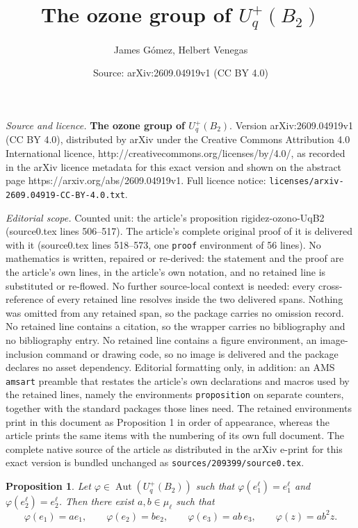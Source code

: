 \documentclass[10pt,a4paper]{amsart}
\title{\textbf{The ozone group of $U_q^+(B_2)$}}
\author{James G\'omez, Helbert Venegas}
\date{Source: arXiv:2609.04919v1 (CC BY 4.0)}
\newtheorem{proposition}{Proposition}
\begin{document}
\maketitle

\noindent\emph{Source and licence.} \textbf{The ozone group of $U_q^+(B_2)$}. Version arXiv:2609.04919v1 (CC BY 4.0), distributed by arXiv under the Creative Commons Attribution 4.0 International licence, http://creativecommons.org/licenses/by/4.0/, as recorded in the arXiv licence metadata for this exact version and shown on the abstract page https://arxiv.org/abs/2609.04919v1. Full licence notice: \texttt{licenses/arxiv-2609.04919-CC-BY-4.0.txt}.\par\smallskip

\noindent\textit{Editorial scope.} Counted unit: the article's proposition rigidez-ozono-UqB2 (source0.tex lines 506--517). The article's complete original proof of it is delivered with it (source0.tex lines 518--573, one \texttt{proof} environment of 56 lines). No mathematics is written, repaired or re-derived: the statement and the proof are the article's own lines, in the article's own notation, and no retained line is substituted or re-flowed.  No further source-local context is needed: every cross-reference of every retained line resolves inside the two delivered spans.  Nothing was omitted from any retained span, so the package carries no omission record.  No retained line contains a citation, so the wrapper carries no bibliography and no bibliography entry.  No retained line contains a figure environment, an image-inclusion command or drawing code, so no image is delivered and the package declares no asset dependency.  Editorial formatting only, in addition: an AMS \texttt{amsart} preamble that restates the article's own declarations and macros used by the retained lines, namely the environments \texttt{proposition} on separate counters, together with the standard packages those lines need.  The retained environments print in this document as Proposition 1 in order of appearance, whereas the article prints the same items with the numbering of its own full document.  The complete native source of the article as distributed in the arXiv e-print for this exact version is bundled unchanged as \texttt{sources/209399/source0.tex}.
\begin{proposition}
\label{rigidez-ozono-UqB2}
Let \(\varphi\in\operatorname{Aut}(U_q^+(B_2))\) such that
\(\varphi(e_1^\ell)=e_1^\ell\) and \(\varphi(e_2^\ell)=e_2^\ell\). Then
there exist \(a,b\in\mu_\ell\) such that
$$
\varphi(e_1)=ae_1,\qquad
\varphi(e_2)=be_2,\qquad
\varphi(e_3)=ab\,e_3,\qquad
\varphi(z)=ab^2z.
$$
\end{proposition}
\end{document}
